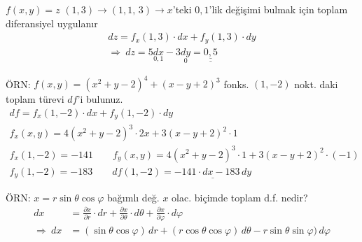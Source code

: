 \documentclass[11pt,a4paper]{article}
\begin{document}
$f(x,y)=z$ \quad $(1,3)\to(1{,}1,\,3)\to x$'teki $0{,}1$'lik değişimi bulmak için toplam diferansiyel uygulanır
\begin{gather*}
dz=f_x(1,3)\cdot dx+f_y(1,3)\cdot dy\\
\Rightarrow\ dz=5\underset{0{,}1}{dx}-3\underset{0}{dy}=\underline{\underline{0{,}5}}
\end{gather*}

ÖRN: $f(x,y)=(x^2+y-2)^4+(x-y+2)^3$ fonks. $(1,-2)$ nokt. daki toplam türevi $df$'i bulunuz.
\begin{gather*}
df=f_x(1,-2)\cdot dx+f_y(1,-2)\cdot dy\\
f_x(x,y)=4(x^2+y-2)^3\cdot2x+3(x-y+2)^2\cdot1\\
f_x(1,-2)=-141\qquad f_y(x,y)=4(x^2+y-2)^3\cdot1+3(x-y+2)^2\cdot(-1)\\
f_y(1,-2)=-183\qquad df(1,-2)=\underline{-141\cdot dx-183\,dy}
\end{gather*}

ÖRN: $x=r\sin\theta\cos\varphi$ bağımlı değ. $x$ olac. biçimde toplam d.f. nedir?
\begin{align*}
dx&=\frac{\partial x}{\partial r}\cdot dr+\frac{\partial x}{\partial\theta}\cdot d\theta+\frac{\partial x}{\partial\varphi}\cdot d\varphi\\
\Rightarrow\ dx&=(\sin\theta\cos\varphi)\,dr+(r\cos\theta\cos\varphi)\,d\theta-r\sin\theta\sin\varphi)\,d\varphi
\end{align*}

\end{document}
